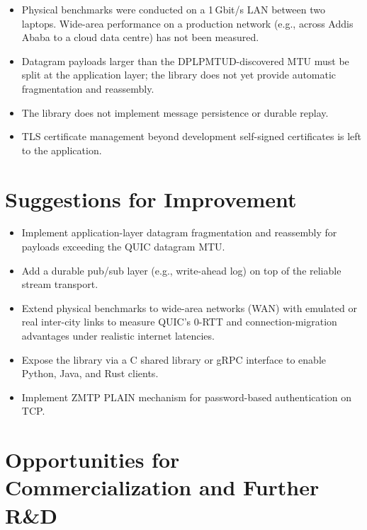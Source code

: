 \documentclass[12pt, a4paper, oneside]{report}
\begin{document}
\begin{itemize}
  \item Physical benchmarks were conducted on a 1\,Gbit/s LAN between two laptops. Wide-area performance on a production network (e.g., across Addis Ababa to a cloud data centre) has not been measured.
  \item Datagram payloads larger than the DPLPMTUD-discovered MTU must be split at the application layer; the library does not yet provide automatic fragmentation and reassembly.
  \item The library does not implement message persistence or durable replay.
  \item TLS certificate management beyond development self-signed certificates is left to the application.
\end{itemize}

\section{Suggestions for Improvement}
\label{sec:suggestions}

\begin{itemize}
  \item Implement application-layer datagram fragmentation and reassembly for payloads exceeding the QUIC datagram MTU.
  \item Add a durable pub/sub layer (e.g., write-ahead log) on top of the reliable stream transport.
  \item Extend physical benchmarks to wide-area networks (WAN) with emulated or real inter-city links to measure QUIC's 0-RTT and connection-migration advantages under realistic internet latencies.
  \item Expose the library via a C shared library or gRPC interface to enable Python, Java, and Rust clients.
  \item Implement ZMTP PLAIN mechanism for password-based authentication on TCP.
\end{itemize}

\section{Opportunities for Commercialization and Further R\&D}
\label{sec:rnd}
\end{document}
